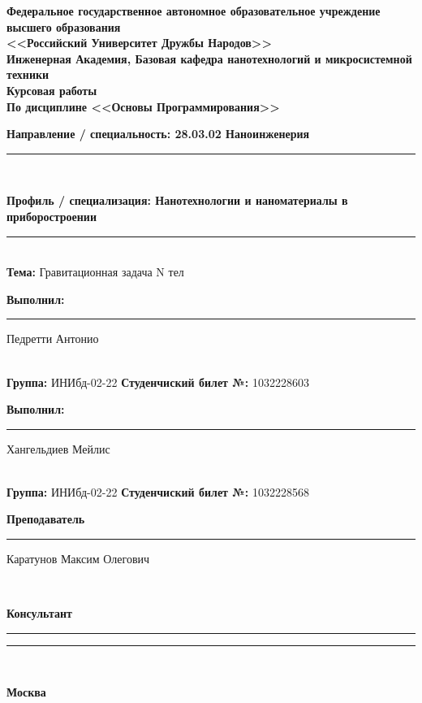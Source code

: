 \documentclass{article}
\begin{document}
  \begin{titlepage}
    \begin{center}
    \textbf{Федеральное государственное автономное образовательное учреждение высшего образования\\ <<Российский Университет Дружбы Народов>>\\[1.5pt]Инженерная Академия, Базовая кафедра нанотехнологий и микросистемной техники}\\ 
      \vfill
      {\bfseries Курсовая работы}\\[.5em]
      {\bfseries По дисциплине <<Основы Программирования>>}\\[.5em]
      \vspace{2em}
      {\bfseries Направление / специальность: 28.03.02 Наноинженерия \rule{0.4\linewidth}{0.4pt}}\\
      {\bfseries Профиль / специализация: Нанотехнологии и наноматериалы в приборостроении\rule{0.47\linewidth}{0.4pt}}\\
      \vspace{2em}
      {\textbf{Тема:} Гравитационная задача N тел}\\
    \end{center}
    \vspace{4em}
    \begin{flushleft}
      {\textbf{Выполнил:} \rule{0.2\textwidth}{0.4pt} \space Педретти Антонио}\\
      {\textbf{Группа:} ИНИбд-02-22 \hspace{30pt}\textbf{Студенчиский билет №:} 1032228603}\\[3em]
      {\textbf{Выполнил:} \rule{0.2\textwidth}{0.4pt} \space Хангельдиев Мейлис}\\
      {\textbf{Группа:} ИНИбд-02-22 \hspace{30pt}\textbf{Студенчиский билет №:} 1032228568}\\[3em]
      {\textbf{Преподаватель} \rule{0.2\textwidth}{0.4pt} \space Каратунов Максим Олегович}\\
      {\textbf{Консультант} \rule{0.2\textwidth}{0.4pt} \space \rule{0.45\linewidth}{0.4pt}}\\
      \vfill
    \end{flushleft}
    \begin{center}
      \bfseries Москва \the\year{} \\
    \end{center}
  \end{titlepage}
\end{document}
